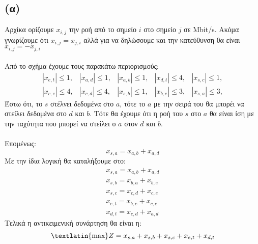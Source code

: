 \documentclass[12pt]{report}
\begin{document}
\subsection*{(α)}
Αρχίκα ορίζουμε $x_{i,j}$ την ροή από το σημείο $i$ στο σημείο $j$ σε
\textlatin{Mbit/s}. Ακόμα γνωρίζουμε ότι
$x_{i,j} = x_{j,i}$ αλλά για να δηλώσουμε και την κατεύθυνση θα είναι $x_{i,j}
    = -x_{j,i}$\\\\
Από το σχήμα έχουμε τους παρακάτω περιορισμούς:
$$
    \begin{array}{rrrrr}
        |x_{e,t} |\leq 1, & |x_{a,d} |\leq 1, & |x_{a,b} |\leq 1, & |x_{d,t} |\leq 4,
                          & |x_{s,c} |\leq 1,                                         \\
        |x_{c,e} |\leq 4, & |x_{c,d} |\leq 4, & |x_{s,b} |\leq 1, & |x_{b,e} |\leq 3,
                          & |x_{s,a} |\leq 3,
    \end{array}
$$
Έστω ότι, το $s$ στέλνει δεδομένα στο $a$, τότε το $a$ με την σειρά του θα
μπορέι να στείλει δεδομένα στο $d$ και $b$.
Τότε θα έχουμε ότι η ροή του $s$ στο $a$ θα είναι ίση με την ταχύτητα που
μπορεί να στείλει ο $a$ στον $d$ και $b$. \\\\
Επομένως:
$$ x_{s,a} = x_{a,b} + x_{a,d}$$
Με την ίδια λογική θα καταλήξουμε στο:
$$
    \begin{array}{r}
        x_{s,a} = x_{a,b} + x_{a,d} \\
        x_{s,b} = x_{b,a} + x_{b,e} \\
        x_{s,c} = x_{c,d} + x_{c,e} \\
        x_{e,t} = x_{b,e} + x_{c,e} \\
        x_{d,t} = x_{c,d} + x_{a,d}
    \end{array}
$$
Τελικά η αντικειμενική συνάρτηση θα είναι η:
$$ \text{\textlatin{max}} Z = x_{s,a} + x_{s,b} +x_{s,c} +x_{e,t} + x_{d,t} $$
\clearpage
\end{document}

